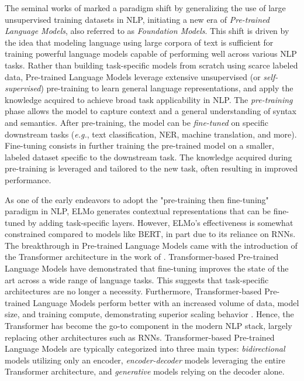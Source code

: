 The seminal works of \citet{peters-etal-2018-deep, devlin2018bert, radford2018improving} marked a paradigm shift by generalizing the use of large unsupervised training datasets in \ac{NLP}, initiating a new era of \textit{Pre-trained Language Models}, also referred to as \textit{Foundation Models}. This shift is driven by the idea that modeling language using large corpora of text is sufficient for training powerful language models capable of performing well across various \ac{NLP} tasks. Rather than building task-specific models from scratch using scarce labeled data, Pre-trained Language Models leverage extensive unsupervised (or \textit{self-supervised}) pre-training to learn general language representations, and apply the knowledge acquired to achieve broad task applicability in \ac{NLP}. The \textit{pre-training} phase allows the model to capture context and a general understanding of syntax and semantics. After pre-training, the model can be \textit{fine-tuned} on specific downstream tasks (\textit{e.g.}, text classification, \ac{NER}, machine translation, and more). Fine-tuning consists in further training the pre-trained model on a smaller, labeled dataset specific to the downstream task. The knowledge acquired during pre-training is leveraged and tailored to the new task, often resulting in improved performance.


As one of the early endeavors to adopt the "pre-training then fine-tuning" paradigm in \ac{NLP}, \ac{ELMo} generates contextual representations that can be fine-tuned by adding task-specific layers. However, \ac{ELMo}'s effectiveness is somewhat constrained compared to models like \ac{BERT}, in part due to its reliance on \acp{RNN}. The breakthrough in Pre-trained Language Models came with the introduction of the Transformer architecture in the work of \citet{vaswani2017attention}. Transformer-based Pre-trained Language Models \citep{devlin2018bert, radford2018improving} have demonstrated that fine-tuning improves the state of the art across a wide range of language tasks. This suggests that task-specific architectures are no longer a necessity. Furthermore, Transformer-based Pre-trained Language Models perform better with an increased volume of data, model size, and training compute, demonstrating superior scaling behavior \citep{kaplan2020scaling}. Hence, the Transformer has become the go-to component in the modern \ac{NLP} stack, largely replacing other architectures such as \acp{RNN}. Transformer-based Pre-trained Language Models are typically categorized into three main types: \textit{bidirectional} models utilizing only an encoder, \textit{encoder-decoder} models leveraging the entire Transformer architecture, and \textit{generative} models relying on the decoder alone.

